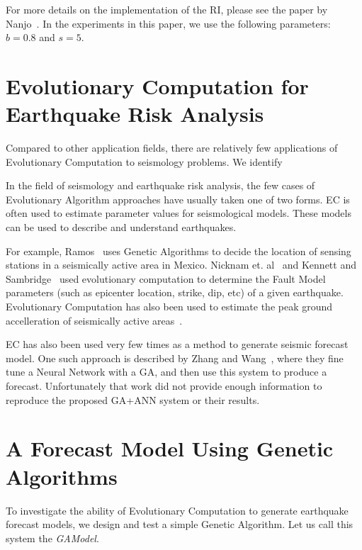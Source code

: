 \documentclass{sig-alternate}
\begin{document}
For more details on the implementation of the RI, please see the paper
by Nanjo~\cite{Nanjo2011}. In the experiments in this paper, we use
the following parameters: $b = 0.8$ and $s = 5$.



\section{Evolutionary Computation for Earthquake Risk Analysis}

Compared to other application fields, there are relatively few
applications of Evolutionary Computation to seismology problems.
We identify 

In the field of seismology and earthquake risk analysis, the few cases
of Evolutionary Algorithm approaches have usually taken one of two
forms. EC is often used to estimate parameter values for seismological
models.  These models can be used to describe and understand
earthquakes.

For example, Ramos~\cite{Ramos2011} uses Genetic Algorithms to decide
the location of sensing stations in a seismically active area in
Mexico. Nicknam et. al~\cite{Nicknam2010} and Kennett and
Sambridge~\cite{Kennett1992} used evolutionary computation to
determine the Fault Model parameters (such as epicenter location,
strike, dip, etc) of a given earthquake. Evolutionary Computation has
also been used to estimate the peak ground accelleration of
seismically active areas~\cite{Kermani2009, Cabalar2009}.

EC has also been used very few times as a method to generate seismic
forecast model. One such approach is described by Zhang and
Wang~\cite{Zhang2012}, where they fine tune a Neural Network with a
GA, and then use this system to produce a forecast. Unfortunately that
work did not provide enough information to reproduce the proposed
GA+ANN system or their results.

\section{A Forecast Model Using Genetic Algorithms} %

To investigate the ability of Evolutionary Computation to generate
earthquake forecast models, we design and test a simple Genetic
Algorithm. Let us call this system the \emph{GAModel}.
\end{document}
